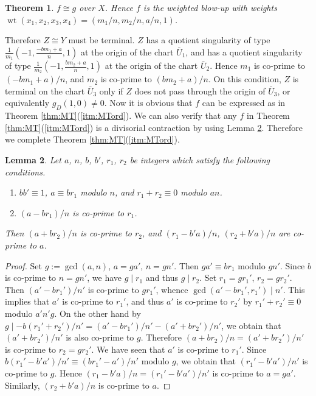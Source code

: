 \documentclass[a4paper,11pt]{amsart}
\newtheorem{theorem}{Theorem}[section]
\newtheorem{lemma}[theorem]{Lemma}
\theoremstyle{definition}
\theoremstyle{remark}
\numberwithin{equation}{section}
\newcommand{\wt}{\operatorname{wt}}
\begin{document}
\begin{theorem}\label{thm:wtd_blow-up}
$f \cong g$ over $X$.
Hence $f$ is the weighted blow-up with weights
$\wt(x_1,x_2,x_3,x_4)=(m_1/n,m_2/n,a/n,1)$.
\end{theorem}

Therefore $Z\cong Y$ must be terminal.
$Z$ has a quotient singularity of type $\frac{1}{m_1}(-1,\frac{-bm_1+a}{n},1)$
at the origin of the chart $\bar{U}_1$,
and has a quotient singularity of type $\frac{1}{m_2}(-1,\frac{bm_2+a}{n},1)$
at the origin of the chart $\bar{U}_2$.
Hence $m_1$ is co-prime to $(-bm_1+a)/n$,
and $m_2$ is co-prime to $(bm_2+a)/n$.
On this condition,
$Z$ is terminal on the chart $\bar{U}_3$ only if
$Z$ does not pass through the origin of $\bar{U}_3$,
or equivalently $g_D(1,0)\neq0$.
Now it is obvious that $f$ can be expressed as in
Theorem \ref{thm:MT}(\ref{itm:MTord}).
We can also verify that
any $f$ in Theorem \ref{thm:MT}(\ref{itm:MTord}) is a divisorial contraction
by using Lemma \ref{lem:final}.
Therefore we complete Theorem \ref{thm:MT}(\ref{itm:MTord}).

\begin{lemma}\label{lem:final}
Let $a$, $n$, $b$, $b'$, $r_1$, $r_2$ be integers
which satisfy the following conditions.
\begin{enumerate}
\item
$bb' \equiv 1$, $a \equiv br_1$ modulo $n$,
and $r_1+r_2 \equiv 0$ modulo $an$.
\item
$(a-br_1)/n$ is co-prime to $r_1$.
\end{enumerate}
Then $(a+br_2)/n$ is co-prime to $r_2$,
and $(r_1-b'a)/n$, $(r_2+b'a)/n$ are co-prime to $a$.
\end{lemma}

\begin{proof}
Set $g:=\gcd(a,n)$, $a=ga'$, $n=gn'$.
Then $ga' \equiv br_1$ modulo $gn'$.
Since $b$ is co-prime to $n=gn'$, we have $g\mid r_1$ and thus $g\mid r_2$.
Set $r_1=gr_1'$, $r_2=gr_2'$.
Then $(a'-br_1')/n'$ is co-prime to $gr_1'$,
whence $\gcd(a'-br_1',r_1')\mid n'$.
This implies that $a'$ is co-prime to $r_1'$,
and thus $a'$ is co-prime to $r_2'$ by $r_1'+r_2' \equiv 0$ modulo $a'n'g$.
On the other hand by $g \mid -b(r_1'+r_2')/n'=(a'-br_1')/n'-(a'+br_2')/n'$,
we obtain that $(a'+br_2')/n'$ is also co-prime to $g$.
Therefore $(a+br_2)/n=(a'+br_2')/n'$ is co-prime to $r_2=gr_2'$.
We have seen that $a'$ is co-prime to $r_1'$.
Since $b(r_1'-b'a')/n' \equiv (br_1'-a')/n'$ modulo $g$,
we obtain that $(r_1'-b'a')/n'$ is co-prime to $g$.
Hence $(r_1-b'a)/n=(r_1'-b'a')/n'$ is co-prime to $a=ga'$.
Similarly, $(r_2+b'a)/n$ is co-prime to $a$.
\end{proof}
\end{document}
